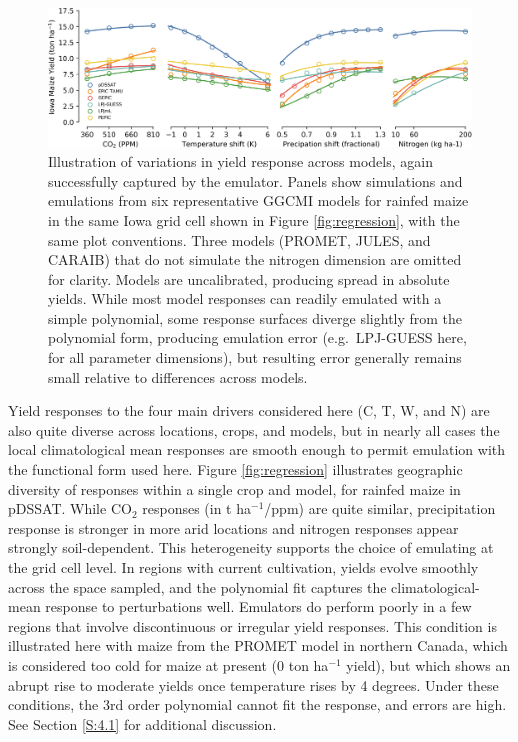 \documentclass[gmd, manuscript]{copernicus} %
\begin{document}
\begin{figure}[h!!]
\centering
    \includegraphics[width=16.3cm]{figures/regression_example_2.png}
    \caption{
    Illustration of variations in yield response across models, again successfully captured by the emulator. 
    Panels show simulations and emulations from six representative GGCMI models for rainfed maize in the same Iowa grid cell shown in Figure \ref{fig:regression}, with the same plot conventions. 
    Three models (PROMET, JULES, and CARAIB) that do not simulate the nitrogen dimension are omitted for clarity. 
    Models are uncalibrated, producing spread in absolute yields. 
	While most model responses can readily emulated with a simple polynomial, some response surfaces diverge slightly from the polynomial form, producing emulation error (e.g.\ LPJ-GUESS here, for all parameter dimensions), but 
    resulting error generally remains small relative to differences across models.
    }
   \label{fig:regression_2}
\end{figure}


Yield responses to the four main drivers considered here (C, T, W, and N) are also quite diverse across locations, crops, and models, but in nearly all cases the local climatological mean responses are smooth enough to permit emulation with the functional form used here.
Figure \ref{fig:regression} illustrates geographic diversity of responses within a single crop and model, for rainfed maize in pDSSAT. While CO$_2$ responses (in t ha$^{-1}$/ppm) are quite similar, precipitation response is stronger in more arid locations and nitrogen responses appear strongly soil-dependent. This heterogeneity supports the choice of emulating at the grid cell level. 
In regions with current cultivation, yields evolve smoothly across the space sampled, and the polynomial fit captures the climatological-mean response to perturbations well. 
Emulators do perform poorly in a few regions that involve discontinuous or irregular yield responses. 
This condition is illustrated here with maize from the PROMET model in northern Canada, which is considered too cold for maize at present (0 ton ha$^{-1}$ yield), but which shows an abrupt rise to moderate yields once temperature rises by 4 degrees. 
Under these conditions, the 3rd order polynomial cannot fit the response, and errors are high. See Section \ref{S:4.1} for additional discussion. 
\end{document}
